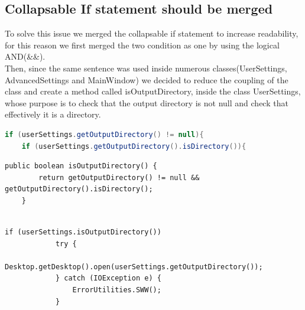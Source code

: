 \documentclass{article}
\begin{document}
\subsection{Collapsable If statement should be merged}
To solve this issue we merged the collapsable if statement to increase readability, for this reason we first merged the two condition as one by using the logical AND(&&).\\
Then, since the same sentence was used inside numerous classes(UserSettings, AdvancedSettings and MainWindow) we decided to reduce the coupling of the class and create a method called isOutputDirectory, inside the class UserSettings, whose purpose is to check that the output directory is not null and check that effectively it is a directory.
\begin{lstlisting}[language=Java,caption={Old Implementation},captionpos=b]
if (userSettings.getOutputDirectory() != null){
    if (userSettings.getOutputDirectory().isDirectory()){
\end{lstlisting}


\begin{lstlisting}[caption={New Implementation},captionpos=b]
public boolean isOutputDirectory() {
        return getOutputDirectory() != null && getOutputDirectory().isDirectory();
    }
    
\end{lstlisting}

\begin{lstlisting}[caption={Application of the new implementation},captionpos=b]
if (userSettings.isOutputDirectory())
            try {
                Desktop.getDesktop().open(userSettings.getOutputDirectory());
            } catch (IOException e) {
                ErrorUtilities.SWW();
            }
\end{lstlisting}

\end{document}
